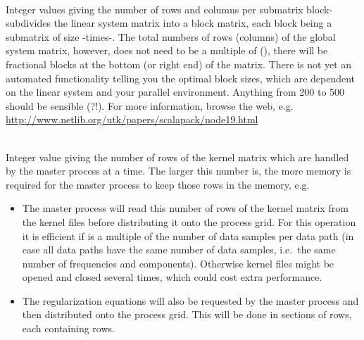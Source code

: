 \textbf{}\\
Integer values giving the number of rows and columns per submatrix block-
 subdivides the linear system matrix into a block matrix, each block being a submatrix of size
-times-.
The total numbers of rows (columns) of the global system matrix, however, does not need to be a multiple of 
 (), there will be fractional blocks at the bottom (or right end) 
of the matrix. There is not yet an automated  functionality telling you the optimal block 
sizes, which are dependent on the linear system and your parallel environment. Anything from 200 to 500 should 
be sensible (?!). For more information, browse the web, 
e.g.\ \\
\url{http://www.netlib.org/utk/papers/scalapack/node19.html}

\textbf{}\\
Integer value giving the number of rows of the kernel matrix which are handled by the master process at a time.
The larger this number is, the more memory is required for the master process to keep those rows in the memory,
e.g.
\begin{itemize}
\item The master process will read this number of rows of the kernel matrix from the kernel files before 
  distributing it onto the process grid. For this operation it is efficient if 
  is a multiple of the number of data samples per data path (in case all data paths have the same number of 
  data samples, i.e.\ the same number of frequencies and components). Otherwise kernel files might be opened 
  and closed several times, which could cost extra performance.
\item The regularization equations will also be requested by the master process and then distributed onto the 
  process grid. This will be done in sections of rows, each containing  rows.
\end{itemize}
%
%
